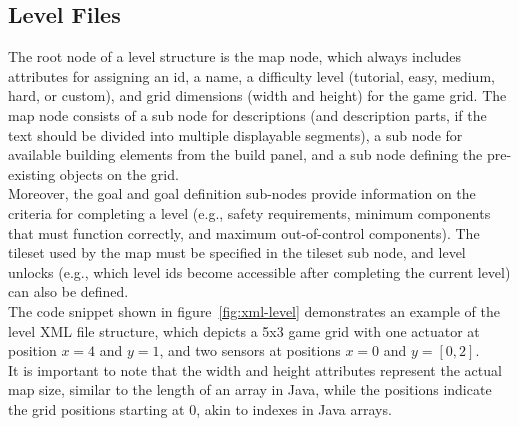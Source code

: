 \subsection{Level Files}\label{subsec:level-files}
The root node of a level structure is the map node, which always includes attributes for assigning an id, a name,
a difficulty level (tutorial, easy, medium, hard, or custom), and grid dimensions (width and height) for the game grid.
The map node consists of a sub node for descriptions (and description parts, if the text should be divided into multiple displayable segments),
a sub node for available building elements from the build panel, and a sub node defining the pre-existing objects on the grid.
\\
Moreover, the goal and goal definition sub-nodes provide information on the criteria for completing a level (e.g.,
safety requirements, minimum components that must function correctly, and maximum out-of-control components).
The tileset used by the map must be specified in the tileset sub node,
and level unlocks (e.g., which level ids become accessible after completing the current level) can also be defined.
\\
The code snippet shown in figure~\ref{fig:xml-level} demonstrates an example of the level XML file structure, which depicts a 5x3 game grid with one actuator at position $x = 4$ and $y = 1$,
and two sensors at positions $x = 0$ and $y = [0, 2]$.
\\
It is important to note that the width and height attributes represent the actual map size, similar to the length of an array in Java,
while the positions indicate the grid positions starting at 0, akin to indexes in Java arrays.
